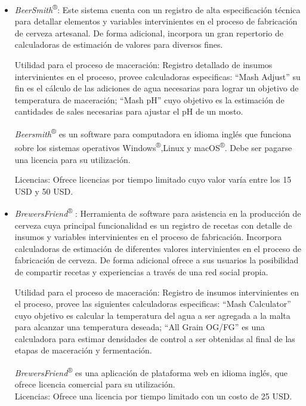     \begin{itemize}
        
        \item {\textit{BeerSmith}\textsuperscript{®}}: Este sistema cuenta con un registro de alta especificación técnica para detallar elementos y variables intervinientes en el proceso de fabricación de cerveza artesanal. De forma adicional, incorpora un gran repertorio de calculadoras de estimación de valores para diversos fines.
        \par
        Utilidad para el proceso de maceración: Registro detallado de insumos intervinientes en el proceso, provee calculadoras especificas: ``Mash Adjust'' su fin es el cálculo de las adiciones de agua necesarias para lograr un objetivo de temperatura de maceración; ``Mash pH'' cuyo objetivo es la estimación de cantidades de sales necesarias para ajustar el pH de un mosto.
        \par
        \textit{Beersmith}\textsuperscript{®} es un software para computadora en idioma inglés que funciona sobre los sistemas operativos Windows\textsuperscript{®},Linux y macOS\textsuperscript{®}. Debe ser pagarse una licencia para su utilización.
        \par
        Licencias: Ofrece licencias por tiempo limitado cuyo valor varía entre los 15 USD y 50 USD.
        
        \item{\textit{BrewersFriend}\textsuperscript{®} }: Herramienta de software para asistencia en la producción de cerveza cuya principal funcionalidad es un registro de recetas con detalle de insumos y variables intervinientes en el proceso de fabricación. Incorpora calculadoras de estimación de diferentes valores intervinientes en el proceso de fabricación de cerveza. De forma adicional ofrece a sus usuarios la posibilidad de compartir recetas y experiencias a través de una red social propia.
        \par
        Utilidad para el proceso de maceración: Registro de insumos intervinientes en el proceso, provee las siguientes calculadoras especificas: ``Mash Calculator'' cuyo objetivo es calcular la temperatura del agua a ser agregada a la malta para alcanzar una temperatura deseada; ``All Grain OG/FG'' es una calculadora para estimar densidades de control a ser obtenidas al final de las etapas de maceración y fermentación.
        \par
        \textit{BrewersFriend}\textsuperscript{®} es una aplicación de plataforma web en idioma inglés, que ofrece licencia comercial para su utilización.\\
        Licencias: Ofrece una licencia por tiempo limitado con un costo de 25 USD.
        

\end{itemize}
